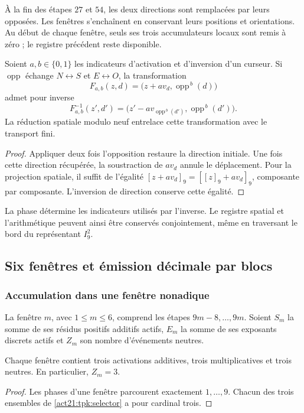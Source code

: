 À la fin des étapes \(27\) et \(54\), les deux directions sont remplacées
par leurs opposées. Les fenêtres s'enchaînent en conservant leurs positions et
orientations. Au début de chaque fenêtre, seuls ses trois accumulateurs locaux sont remis à zéro ; le registre précédent reste disponible.

\begin{proposition}
\label{act21:tpk:inversion}
Soient \(a,b\in\{0,1\}\) les indicateurs d'activation et d'inversion d'un
curseur. Si \(\operatorname{opp}\) échange \(N\leftrightarrow S\) et
\(E\leftrightarrow O\), la transformation
\[
 F_{a,b}(z,d)=\bigl(z+a v_d,\operatorname{opp}^{\,b}(d)\bigr)
\]
admet pour inverse
\[
 F_{a,b}^{-1}(z',d')=
 \bigl(z'-a v_{\operatorname{opp}^{\,b}(d')},
       \operatorname{opp}^{\,b}(d')\bigr).
\]
La réduction spatiale modulo neuf entrelace cette transformation avec le
transport fini.
\end{proposition}
\begin{proof}
Appliquer deux fois l'opposition restaure la direction initiale. Une fois
cette direction récupérée, la soustraction de \(a v_d\) annule le déplacement.
Pour la projection spatiale, il suffit de l'égalité
\([z+a v_d]_9=[[z]_9+a v_d]_9\), composante par composante. L'inversion de
direction conserve cette égalité.
\end{proof}

La phase détermine les indicateurs utilisés par l'inverse. Le registre
spatial et l'arithmétique peuvent ainsi être conservés conjointement, même en
traversant le bord du représentant \(I_9^2\).

\subsection{Six fenêtres et émission décimale par blocs}
\label{act21:tpk:emision}

\subsubsection{Accumulation dans une fenêtre nonadique}

La fenêtre \(m\), avec \(1\leq m\leq6\), comprend les étapes
\(9m-8,\ldots,9m\). Soient \(S_m\) la somme de ses résidus positifs
additifs actifs, \(E_m\) la somme de ses exposants discrets actifs et
\(Z_m\) son nombre d'événements neutres.

\begin{lemma}
\label{act21:tpk:tres-eventos}
Chaque fenêtre contient trois activations additives, trois multiplicatives et
trois neutres. En particulier, \(Z_m=3\).
\end{lemma}
\begin{proof}
Les phases d'une fenêtre parcourent exactement \(1,\ldots,9\). Chacun
des trois ensembles de \eqref{act21:tpk:selector} a pour cardinal trois.
\end{proof}

